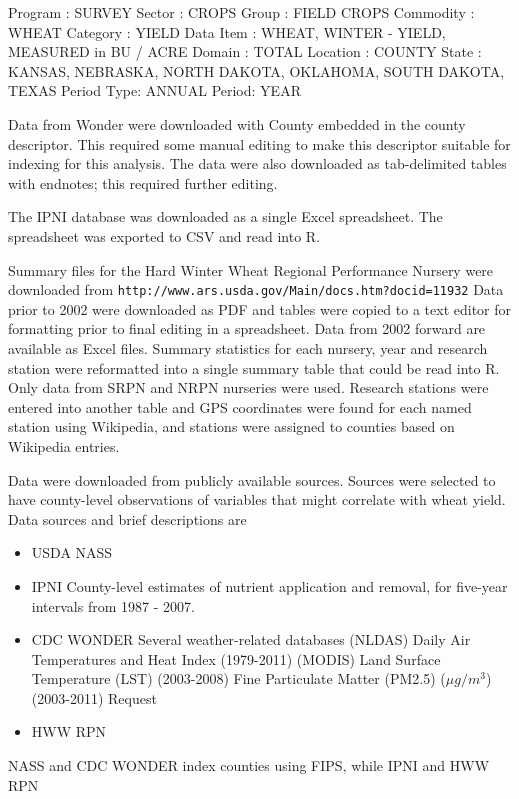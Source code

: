 \documentclass[paperwidth=42in,paperheight=44in]{baposter}
\begin{document}
\begin{poster}
{Program : SURVEY
Sector : CROPS
Group : FIELD CROPS
Commodity : WHEAT
Category : YIELD
Data Item : WHEAT, WINTER - YIELD, MEASURED in BU / ACRE
Domain : TOTAL
Location : COUNTY
State : KANSAS, NEBRASKA, NORTH DAKOTA, OKLAHOMA, SOUTH DAKOTA, TEXAS
Period Type: ANNUAL
Period: YEAR
 
Data from Wonder were downloaded with County embedded in the county descriptor. This required some manual editing to make this descriptor suitable for indexing for this analysis. The data were also downloaded as tab-delimited tables with endnotes; this required further editing.

The IPNI database was downloaded as a single Excel spreadsheet. The spreadsheet was exported to CSV and read into R. 

Summary files for the Hard Winter Wheat Regional Performance Nursery were downloaded from \verb|http://www.ars.usda.gov/Main/docs.htm?docid=11932|
Data prior to 2002 were downloaded as PDF and tables were copied to a text editor for formatting prior to final editing in a spreadsheet. Data from 2002 forward are available as Excel files. Summary statistics for each nursery, year and research station were reformatted into a single summary table that could be read into R. Only data from SRPN and NRPN nurseries were used. Research stations were entered into another table and GPS coordinates were found for each named station using Wikipedia, and stations were assigned to counties based on Wikipedia entries.

Data were downloaded from publicly available sources. Sources were selected to have county-level observations of variables that might correlate with wheat yield. 
Data sources and brief descriptions are
\begin{itemize}
   \item{USDA NASS} \cite{usda-nass}
   
   \item{IPNI}
      County-level estimates of nutrient application and removal, for five-year intervals from 1987 - 2007.
   \item{CDC WONDER}
      Several weather-related databases
      (NLDAS) Daily Air Temperatures and Heat Index (1979-2011) 
      (MODIS) Land Surface Temperature (LST) (2003-2008)
      Fine Particulate Matter (PM2.5) ($\mu g / m^3$) (2003-2011) Request
   \item{HWW RPN}
\end{itemize}
NASS and CDC WONDER index counties using FIPS, while IPNI and HWW RPN 

}
\end{poster}
\end{document}

